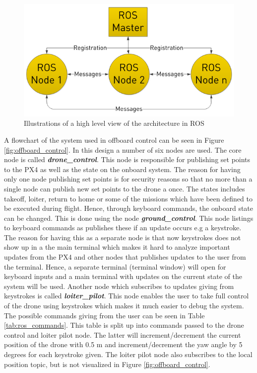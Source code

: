 \documentclass[../Head/report.tex]{subfiles}
\begin{document}
\begin{figure}[H]
    \centering
    \includegraphics[width=0.6\linewidth]{../Figures/ros.png}
    \caption{Illustrations of a high level view of the architecture in ROS}
    \label{fig:ros}
\end{figure}

A flowchart of the system used in offboard control can be seen in Figure \ref{fig:offboard_control}. In this design a number of six nodes are used. The core node is called \textit{\textbf{drone\_control}}. This node is responsible for publishing set points to the PX4 as well as the state on the onboard system. The reason for having only one node publishing set points is for security reasons so that no more than a single node can publish new set points to the drone a once. The states includes takeoff, loiter, return to home or some of the missions which have been defined to be executed during flight. Hence, through keyboard commands, the onboard state can be changed. This is done using the node \textit{\textbf{ground\_control}}. This node listings to keyboard commands as publishes these if an update occurs e.g a keystroke. The reason for having this as a separate node is that now keystrokes does not show up in a the main terminal which makes it hard to analyze important updates from the PX4 and other nodes that publishes updates to the user from the terminal. Hence, a separate terminal (terminal window) will open for keyboard inputs and a main terminal with updates on the current state of the system will be used. Another node which subscribes to updates giving from keystrokes is called  \textit{\textbf{loiter\_pilot}}. This node enables the user to take full control of the drone using keystrokes which makes it much easier to debug the system. The possible commands giving from the user can be seen in Table \ref{tab:ros_commands}. This table is split up into commands passed to the drone control and loiter pilot node. The latter will increment/decrement the current position of the drone with 0.5 m and increment/decrement the yaw angle by 5 degrees for each keystroke given. The loiter pilot node also subscribes to the local position topic, but is not visualized in Figure \ref{fig:offboard_control}.
\end{document}
